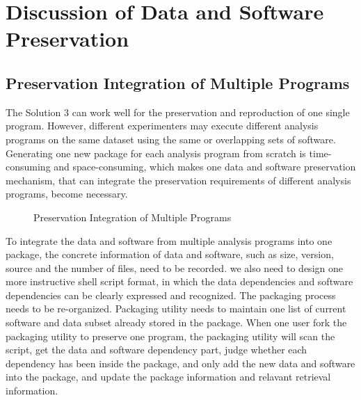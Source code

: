 \documentclass{acm_proc_article-sp}
\begin{document}
\section{Discussion of Data and Software Preservation}
\subsection{Preservation Integration of Multiple Programs}
The Solution 3 can work well for the preservation and reproduction of one single program. However, different experimenters may execute different analysis programs on the same dataset using the same or overlapping sets of software. Generating one new package for each analysis program from scratch is time-consuming and space-consuming, which makes one data and software preservation mechanism, that can integrate the preservation requirements of different analysis programs, become necessary. 

\begin{figure}
\centering
{}
\caption{Preservation Integration of Multiple Programs}
\label{fig:Preservation integration}
\end{figure}

To integrate the data and software from multiple analysis programs into one
package, the concrete information of data and software, such as size, version,
source and the number of files, need to be recorded. we also need to design one
more instructive shell script format, in which the data dependencies and
software dependencies can be clearly expressed and recognized. The packaging
process needs to be re-organized. Packaging utility needs to maintain one list
of current software and data subset already stored in the package. When one
user fork the packaging utility to preserve one program, the
packaging utility will scan the script, get the data and software dependency
part, judge whether each dependency has been inside the package, and only add
the new data and software into the package, and update the package information
and relavant retrieval information.
\end{document}
